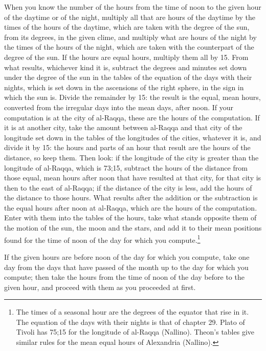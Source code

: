 \documentclass[11pt]{article}
\newcommand{\ArPage}[1]{\marginpar{\footnotesize\color{gray}Ar.\,p.\,#1}}
\begin{document}
\par \ArPage{109}When you know the number of the hours from the time of noon to the given hour of the daytime or of the night, multiply all that are hours of the daytime by the times of the hours of the daytime, which are taken with the degree of the sun, from its degrees, in the given clime, and multiply what are hours of the night by the times of the hours of the night, which are taken with the counterpart of the degree of the sun. If the hours are equal hours, multiply them all by 15. From what results, whichever kind it is, subtract the degrees and minutes set down under the degree of the sun in the tables of the equation of the days with their nights, which is set down in the ascensions of the right sphere, in the sign in which the sun is. Divide the remainder by 15: the result is the equal, mean hours, converted from the irregular days into the mean days, after noon. If your computation is at the city of al-Raqqa, these are the hours of the computation. If it is at another city, take the amount between al-Raqqa and that city of the longitude set down in the tables of the longitudes of the cities, whatever it is, and divide it by 15: the hours and parts of an hour that result are the hours of the distance, so keep them. Then look: if the longitude of the city is greater than the longitude of al-Raqqa, which is 73;15, subtract the hours of the distance from those equal, mean hours after noon that have resulted at that city, for that city is then to the east of al-Raqqa; if the distance of the city is less, add the hours of the distance to those hours. What results after the addition or the subtraction is the equal hours after noon at al-Raqqa, which are the hours of the computation. Enter with them into the tables of the hours, take what stands opposite them of the motion of the sun, the moon and the stars, and add it to their mean positions found for the time of noon of the day for which you compute.\footnote{The times of a seasonal hour are the degrees of the equator that rise in it. The equation of the days with their nights is that of chapter 29. Plato of Tivoli has 75;15 for the longitude of al-Raqqa (Nallino). Theon's tables give similar rules for the mean equal hours of Alexandria (Nallino).}\par
\par If the given hours are before noon of the day for which you compute, take one day from the days that have passed of the month up to the day for which you compute; then take the hours from the time of noon of the day before to the given hour, and proceed with them as you proceeded at first.\par
\end{document}
